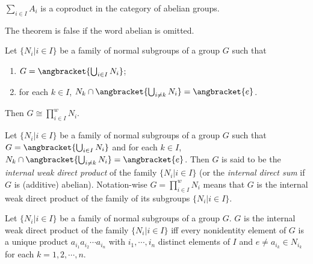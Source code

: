 \begin{Theorem}
	$ \sum_{i \in I}A_i $ is a coproduct in the category of abelian groups.
\end{Theorem}
The theorem is false if the word abelian is omitted.
\begin{Theorem}
	Let $ \{N_i | i\in I \} $ be a family of normal subgroups of a group $ G $ such that
	\begin{enumerate}
		\item $ G=\angbracket{\bigcup_{i \in I}N_i } $;
		\item for each $ k \in I $, $ N_k\cap \angbracket{\bigcup_{i \neq k}N_i} =\angbracket{e}$.
	\end{enumerate}
Then $ G \cong \prod_{i \in I}^{w}N_i $.
\end{Theorem}
\begin{Definition}
	Let $ \{N_i | i \in I \} $ be a family of normal subgroups of a group $ G $ such that $ G=\angbracket{\bigcup_{i \in I}N_i } $ and for each $ k \in I $, $ N_k\cap \angbracket{\bigcup_{i \neq k}N_i} =\angbracket{e}$. Then $ G $ is said to be the \textit{internal weak direct product} of the family $ \{N_i | i \in I \} $ (or the \textit{internal direct sum} if $ G $ is (additive) abelian). Notation-wise $ G=\prod_{i \in I}^{w}N_i $ means that $ G $ is the internal weak direct product of the family of its subgroups $ \{N_i | i\in I \} $.
\end{Definition}
\begin{Theorem}
	Let $ \{N_i | i \in I \} $ be a family of normal subgroups of a group $ G $. $ G $ is the internal weak direct product of the family $ \{N_i | i\in I \} $ iff every nonidentity element of $ G $ is a unique product $ a_{i_1}a_{i_2}\cdots a_{i_n} $ with $ i_1,\cdots,i_n $ distinct elements of $ I $ and $ e \neq a_{i_k}\in N_{i_k} $ for each $ k = 1,2,\cdots, n $.
\end{Theorem}

